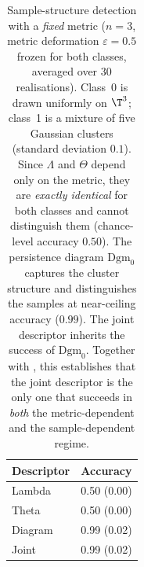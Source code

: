 \begin{table}[htbp]\centering
\caption{Sample-structure detection with a \emph{fixed} metric
(\(n=3\), metric deformation \(\varepsilon=0.5\) frozen for both classes,
averaged over 30 realisations). Class~0 is drawn uniformly on \(\T^3\);
class~1 is a mixture of five Gaussian clusters (standard deviation \(0.1\)).
Since \(\Lambda\) and \(\Theta\) depend only on the metric, they are
\emph{exactly identical} for both classes and cannot distinguish them
(chance-level accuracy \(0.50\)). The persistence diagram \(\mathrm{Dgm}_0\)
captures the cluster structure and distinguishes the samples at near-ceiling
accuracy (\(0.99\)). The joint descriptor inherits the success of
\(\mathrm{Dgm}_0\). Together with , this establishes that
the joint descriptor is the only one that succeeds in \emph{both} the
metric-dependent and the sample-dependent regime.}
\label{tab:sample-structure}
\begin{tabular}{lc}\hline
Descriptor & Accuracy \\\hline
Lambda & 0.50 (0.00) \\
Theta & 0.50 (0.00) \\
Diagram & 0.99 (0.02) \\
Joint & 0.99 (0.02) \\
\hline\end{tabular}\end{table}